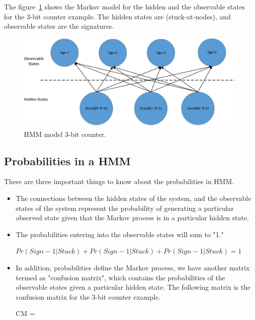 The figure~\ref{fig:HMM-3-bit} shows the Markov model for the hidden and the observable states for the 3-bit counter example. The hidden states are (stuck-at-nodes), and observable states are  the signatures. 


\begin{figure}[tb!]

 \centering
  \captionsetup{justification=centering}    
   \includegraphics[scale=0.8]{Figures/HMM.pdf}
   \caption{HMM model 3-bit counter.}
\label{fig:HMM-3-bit}
\end{figure}

\subsection{Probabilities in a HMM}

There are three important things to know about the probabilities in HMM.

\begin{itemize}
\item The connections between the hidden states of the system, and the observable states of the system represent the probability of generating a particular observed state given that the Markov process is in a particular hidden state.

\item The probabilities entering into the observable states will sum to "1." 

\begin{center}
$Pr(Sign-1|Stuck) + Pr(Sign-1|Stuck) + Pr(Sign-1|Stuck)  = 1 $
\end{center}

\item In addition, probabilities define the Markov process, we have another matrix termed as "confusion matrix", which contains the probabilities of the observable states given a particular hidden state. The following matrix is the confusion matrix for the 3-bit counter example.


\begin{center}


CM = 
\end{center}
\end{itemize}


